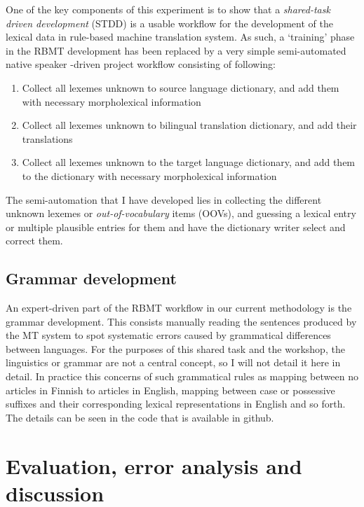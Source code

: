 \documentclass[free]{flammie}
\begin{document}
One of the key components of this experiment is to show that a
\textit{shared-task driven development} (STDD) is a usable workflow
for the development of the lexical data in rule-based machine translation
system.  As such, a `training' phase in the RBMT development has been replaced
by a very simple semi-automated native speaker -driven project workflow
consisting of following:

\begin{enumerate}
    \item Collect all lexemes unknown to source language dictionary, and add them
        with necessary morpholexical information
    \item Collect all lexemes unknown to bilingual translation dictionary,
        and add their translations
    \item Collect all lexemes unknown to the target language dictionary,
        and add them to the dictionary with necessary morpholexical information
\end{enumerate}

The semi-automation that I have developed lies in collecting the different
unknown lexemes or \textit{out-of-vocabulary} items (OOVs), and guessing a
lexical entry or multiple plausible entries for them and have the dictionary
writer select and correct them.


\subsection{Grammar development}
\label{sec:grammar-development}

An expert-driven part of the RBMT workflow in our current methodology is the
grammar development. This consists manually reading the sentences produced by
the MT system to spot systematic errors caused by grammatical differences
between languages. For the purposes of this shared task and the workshop, the
linguistics or grammar are not a central concept, so I will not detail it here
in detail. In practice this concerns of such grammatical rules as mapping
between no articles in Finnish to articles in English, mapping between case or
possessive suffixes and their corresponding lexical representations in English
and so forth. The details can be seen in the code that is available in github.


\section{Evaluation, error analysis and discussion}
\label{sec:error-analysis}
\end{document}
